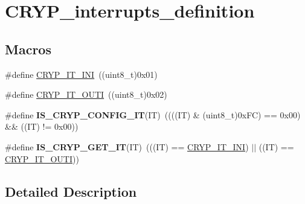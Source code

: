 \hypertarget{group___c_r_y_p__interrupts__definition}{\section{C\-R\-Y\-P\-\_\-interrupts\-\_\-definition}
\label{group___c_r_y_p__interrupts__definition}
}
\subsection*{Macros}
\begin{DoxyCompactItemize}
\item 
\#define \hyperlink{group___c_r_y_p__interrupts__definition_gab6d24428b95658217df49013a81b4f7c}{C\-R\-Y\-P\-\_\-\-I\-T\-\_\-\-I\-N\-I}~((uint8\-\_\-t)0x01)
\item 
\#define \hyperlink{group___c_r_y_p__interrupts__definition_ga53c211cbd38a3704dfc91aa8f3d20517}{C\-R\-Y\-P\-\_\-\-I\-T\-\_\-\-O\-U\-T\-I}~((uint8\-\_\-t)0x02)
\item 
\hypertarget{group___c_r_y_p__interrupts__definition_ga4c4c82448160d94c95405f07a673d007}{\#define {\bfseries I\-S\-\_\-\-C\-R\-Y\-P\-\_\-\-C\-O\-N\-F\-I\-G\-\_\-\-I\-T}(I\-T)~((((I\-T) \& (uint8\-\_\-t)0x\-F\-C) == 0x00) \&\& ((\-I\-T) != 0x00))}\label{group___c_r_y_p__interrupts__definition_ga4c4c82448160d94c95405f07a673d007}

\item 
\hypertarget{group___c_r_y_p__interrupts__definition_gab6d354f835c9b0e88d2c0d46fc1880e9}{\#define {\bfseries I\-S\-\_\-\-C\-R\-Y\-P\-\_\-\-G\-E\-T\-\_\-\-I\-T}(I\-T)~(((I\-T) == \hyperlink{group___c_r_y_p__interrupts__definition_gab6d24428b95658217df49013a81b4f7c}{C\-R\-Y\-P\-\_\-\-I\-T\-\_\-\-I\-N\-I}) $|$$|$ ((I\-T) == \hyperlink{group___c_r_y_p__interrupts__definition_ga53c211cbd38a3704dfc91aa8f3d20517}{C\-R\-Y\-P\-\_\-\-I\-T\-\_\-\-O\-U\-T\-I}))}\label{group___c_r_y_p__interrupts__definition_gab6d354f835c9b0e88d2c0d46fc1880e9}

\end{DoxyCompactItemize}


\subsection{Detailed Description}


